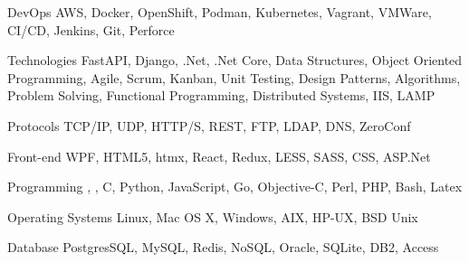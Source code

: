 

\begin{cvskills}

  \cvskill
    {DevOps} %
    {AWS, Docker, OpenShift, Podman, Kubernetes, Vagrant, VMWare, CI/CD, Jenkins, Git, Perforce} %

  \cvskill
    {Technologies} %
    {FastAPI, Django, .Net, .Net Core, Data Structures, Object Oriented Programming, Agile, Scrum, Kanban, Unit Testing, Design Patterns, Algorithms, Problem Solving, Functional Programming, Distributed Systems, IIS, LAMP} %

  \cvskill
	{Protocols} %
	{TCP/IP, UDP, HTTP/S, REST, FTP, LDAP, DNS, ZeroConf } %

  \cvskill
    {Front-end} %
    {WPF, HTML5, htmx, React, Redux, LESS, SASS, CSS, ASP.Net} %

  \cvskill
    {Programming} %
    {\Cpp, \Csh, C, Python, JavaScript, Go, Objective-C, Perl, PHP, Bash, Latex} %

  \cvskill
    {Operating Systems} %
    {Linux, Mac OS X, Windows, AIX, HP-UX, BSD Unix} %

  \cvskill
	{Database} %
	{PostgresSQL, MySQL, Redis, NoSQL, Oracle, SQLite, DB2, Access} %

\end{cvskills}


